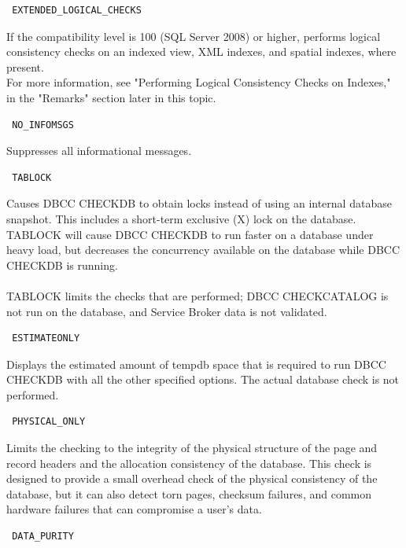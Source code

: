 \documentclass[english]{article}
\begin{document}
\begin{verbatim} EXTENDED_LOGICAL_CHECKS
\end{verbatim}
If the compatibility level is 100 (SQL Server 2008) or higher, performs logical consistency checks on an indexed view, XML indexes, and spatial indexes, where present.\\
For more information, see "Performing Logical Consistency Checks on Indexes," in the "Remarks" section later in this topic.
\begin{verbatim} NO_INFOMSGS
\end{verbatim}
Suppresses all informational messages.
\begin{verbatim} TABLOCK
\end{verbatim}
Causes DBCC CHECKDB to obtain locks instead of using an internal database snapshot. This includes a short-term exclusive (X) lock on the database. TABLOCK will cause DBCC CHECKDB to run faster on a database under heavy load, but decreases the concurrency available on the database while DBCC CHECKDB is running.\\\\
TABLOCK limits the checks that are performed; DBCC CHECKCATALOG is not run on the database, and Service Broker data is not validated.
\begin{verbatim} ESTIMATEONLY
\end{verbatim}
Displays the estimated amount of tempdb space that is required to run DBCC CHECKDB with all the other specified options. The actual database check is not performed.

\begin{verbatim} PHYSICAL_ONLY
\end{verbatim}
Limits the checking to the integrity of the physical structure of the page and record headers and the allocation consistency of the database. This check is designed to provide a small overhead check of the physical consistency of the database, but it can also detect torn pages, checksum failures, and common hardware failures that can compromise a user's data.
\begin{verbatim} DATA_PURITY
\end{verbatim}
\end{document}
